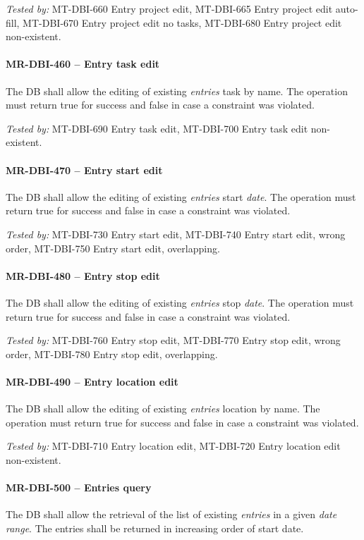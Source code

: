 \textit{Tested by: } MT-DBI-660 Entry project edit,
MT-DBI-665 Entry project edit auto-fill,
MT-DBI-670 Entry project edit no tasks,
MT-DBI-680 Entry project edit non-existent.

\paragraph{MR-DBI-460 -- Entry task edit}
The \gls{DB} shall allow the editing of existing \emph{entries} task
by name.
The operation must return true for success and false in case a
constraint was violated.

\textit{Tested by: } MT-DBI-690 Entry task edit,
MT-DBI-700 Entry task edit non-existent.

\paragraph{MR-DBI-470 -- Entry start edit}
The \gls{DB} shall allow the editing of existing \emph{entries} start
\emph{date}.
The operation must return true for success and false in case a
constraint was violated.

\textit{Tested by: } MT-DBI-730 Entry start edit,
MT-DBI-740 Entry start edit, wrong order,
MT-DBI-750 Entry start edit, overlapping.

\paragraph{MR-DBI-480 -- Entry stop edit}
The \gls{DB} shall allow the editing of existing \emph{entries} stop
\emph{date}.
The operation must return true for success and false in case a
constraint was violated.

\textit{Tested by: } MT-DBI-760 Entry stop edit,
MT-DBI-770 Entry stop edit, wrong order,
MT-DBI-780 Entry stop edit, overlapping.

\paragraph{MR-DBI-490 -- Entry location edit}
The \gls{DB} shall allow the editing of existing \emph{entries} location
by name.
The operation must return true for success and false in case a
constraint was violated.

\textit{Tested by: } MT-DBI-710 Entry location edit,
MT-DBI-720 Entry location edit non-existent.

\paragraph{MR-DBI-500 -- Entries query}
The \gls{DB} shall allow the retrieval of the list of existing \emph{entries}
in a given \emph{date range}. The entries shall be returned in
increasing order of start date.

